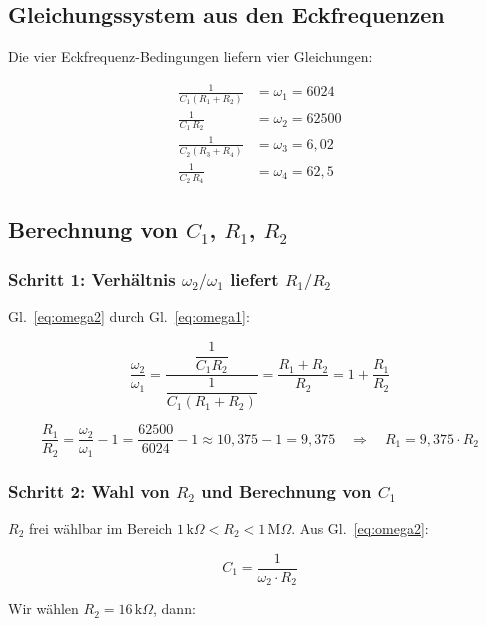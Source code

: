 \documentclass[12pt,a4paper]{article}
\begin{document}
\subsection{Gleichungssystem aus den Eckfrequenzen}

Die vier Eckfrequenz-Bedingungen liefern vier Gleichungen:

\begin{align}
  \frac{1}{C_1(R_1 + R_2)} &= \omega_1 = 6024   \label{eq:omega1} \\[6pt]
  \frac{1}{C_1 \, R_2}      &= \omega_2 = 62500  \label{eq:omega2} \\[6pt]
  \frac{1}{C_2(R_3 + R_4)}  &= \omega_3 = 6{,}02 \label{eq:omega3} \\[6pt]
  \frac{1}{C_2 \, R_4}       &= \omega_4 = 62{,}5 \label{eq:omega4}
\end{align}

\subsection{Berechnung von $C_1$, $R_1$, $R_2$}

\subsubsection*{Schritt 1: Verhältnis $\omega_2 / \omega_1$ liefert $R_1/R_2$}

Gl.~\eqref{eq:omega2} durch Gl.~\eqref{eq:omega1}:

\[
  \frac{\omega_2}{\omega_1}
  = \frac{\dfrac{1}{C_1 R_2}}{\dfrac{1}{C_1(R_1+R_2)}}
  = \frac{R_1 + R_2}{R_2}
  = 1 + \frac{R_1}{R_2}
\]

\[
  \frac{R_1}{R_2}
  = \frac{\omega_2}{\omega_1} - 1
  = \frac{62500}{6024} - 1
  \approx 10{,}375 - 1
  = 9{,}375
  \quad \Longrightarrow \quad
  \boxed{R_1 = 9{,}375 \cdot R_2}
\]

\subsubsection*{Schritt 2: Wahl von $R_2$ und Berechnung von $C_1$}

$R_2$ frei wählbar im Bereich $1\,\text{k}\Omega < R_2 < 1\,\text{M}\Omega$.
Aus Gl.~\eqref{eq:omega2}:

\[
  C_1 = \frac{1}{\omega_2 \cdot R_2}
\]

Wir wählen $R_2 = 16\,\text{k}\Omega$, dann:
\end{document}
